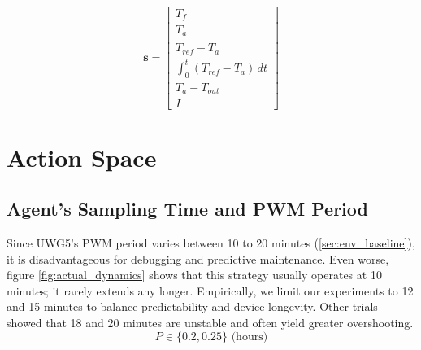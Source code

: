 \documentclass[../main.tex]{subfiles}
\begin{document}
\begin{equation}
    \mathbf{s} = \begin{bmatrix*}
        T_f \\
        T_a \\
        T_{ref} - \overline{T}_a \\
        \int_{0}^{t} (T_{ref} - T_a) \,dt \\
        T_a - T_{out} \\
        I
    \end{bmatrix*}
\label{eq:obs}
\end{equation}

\section{Action Space} \label{sec:agent_action}
\subsection{Agent's Sampling Time and PWM Period}
Since UWG5's PWM period varies between 10 to 20 minutes (\ref{sec:env_baseline}), it is disadvantageous for debugging and predictive maintenance. Even worse, figure \ref{fig:actual_dynamics} shows that this strategy usually operates at 10 minutes; it rarely extends any longer. Empirically, we limit our experiments to 12 and 15 minutes to balance predictability and device longevity. Other trials showed that 18 and 20 minutes are unstable and often yield greater overshooting. 
    $$P \in \{ 0.2, 0.25 \} \text{ (hours)}$$
\end{document}
